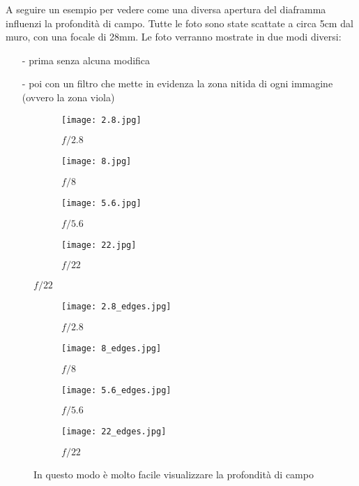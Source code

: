 A seguire un esempio per vedere come una diversa apertura del diaframma influenzi la profondità di campo. Tutte le foto sono state scattate a circa 5cm dal muro, con una focale di 28mm.
Le foto verranno mostrate in due modi diversi:
\begin{itemize}
    \item[-] prima senza alcuna modifica
    \item[-] poi con un filtro che mette in evidenza la zona nitida di ogni immagine (ovvero la zona viola)
\end{itemize}

\begin{figure}[H] %
    \centering
        \begin{subfigure}{0.45\linewidth}
            \texttt{[image: 2.8.jpg]}
            \caption{$f/2.8$}
        \end{subfigure}
    \hfil
        \begin{subfigure}{0.45\linewidth}
            \texttt{[image: 8.jpg]}
            \caption{$f/8$}
        \end{subfigure}
    
        \begin{subfigure}{0.45\linewidth}
            \texttt{[image: 5.6.jpg]}
            \caption{$f/5.6$}
        \end{subfigure}
    \hfil
        \begin{subfigure}{0.45\linewidth}
            \texttt{[image: 22.jpg]}
            \caption{$f/22$}
        \end{subfigure}
    
\end{figure}

\begin{figure}[H]
    \centering
        \begin{subfigure}{0.45\linewidth}
            \texttt{[image: 2.8\_edges.jpg]}
            \caption{$f/2.8$}
        \end{subfigure}
    \hfil
        \begin{subfigure}{0.45\linewidth}
            \texttt{[image: 8\_edges.jpg]}
            \caption{$f/8$}
        \end{subfigure}
    
        \begin{subfigure}{0.45\linewidth}
            \texttt{[image: 5.6\_edges.jpg]}
            \caption{$f/5.6$}
        \end{subfigure}
    \hfil
        \begin{subfigure}{0.45\linewidth}
            \texttt{[image: 22\_edges.jpg]}
            \caption{$f/22$}
        \end{subfigure}
    
    \caption{In questo modo è molto facile visualizzare la profondità di campo}
\end{figure}



